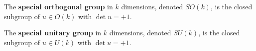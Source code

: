 The \textbf{special orthogonal group} in $k$ dimensions, denoted $SO(k)$, is the closed subgroup of $u \in O(k)$ with $\det u = +1$.

The \textbf{special unitary group} in $k$ dimensions, denoted $SU(k)$, is the closed subgroup of $u \in U(k)$ with $\det u = +1$.

